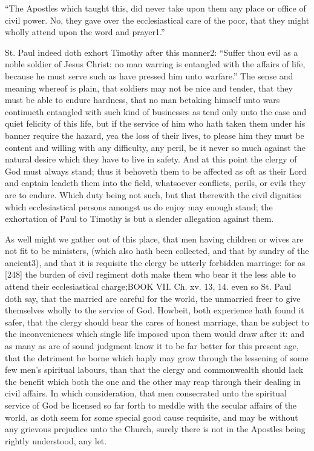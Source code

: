 “The Apostles which taught this, did never take upon them any place or office of civil power. No, they gave over the ecclesiastical care of the poor, that they might wholly attend upon the word and prayer1.”

St. Paul indeed doth exhort Timothy after this manner2: “Suffer thou evil as a noble soldier of Jesus Christ: no man warring is entangled with the affairs of life, because he must serve such as have pressed him unto warfare.” The sense and meaning whereof is plain, that soldiers may not be nice and tender, that they must be able to endure hardness, that no man betaking himself unto wars continueth entangled with such kind of businesses as tend only unto the ease and quiet felicity of this life, but if the service of him who hath taken them under his banner require the hazard, yea the loss of their lives, to please him they must be content and willing with any difficulty, any peril, be it never so much against the natural desire which they have to live in safety. And at this point the clergy of God must always stand; thus it behoveth them to be affected as oft as their Lord and captain leadeth them into the field, whatsoever conflicts, perils, or evils they are to endure. Which duty being not such, but that therewith the civil dignities which ecclesiastical persons amongst us do enjoy may enough stand; the exhortation of Paul to Timothy is but a slender allegation against them.

As well might we gather out of this place, that men having children or wives are not fit to be ministers, (which also hath been collected, and that by sundry of the ancient3), and that it is requisite the clergy be utterly forbidden marriage: for as [248] the burden of civil regiment doth make them who bear it the less able to attend their ecclesiastical charge;BOOK VII. Ch. xv. 13, 14. even so St. Paul doth say, that the married are careful for the world, the unmarried freer to give themselves wholly to the service of God. Howbeit, both experience hath found it safer, that the clergy should bear the cares of honest marriage, than be subject to the inconveniences which single life imposed upon them would draw after it: and as many as are of sound judgment know it to be far better for this present age, that the detriment be borne which haply may grow through the lessening of some few men’s spiritual labours, than that the clergy and commonwealth should lack the benefit which both the one and the other may reap through their dealing in civil affairs. In which consideration, that men consecrated unto the spiritual service of God be licensed so far forth to meddle with the secular affairs of the world, as doth seem for some special good cause requisite, and may be without any grievous prejudice unto the Church, surely there is not in the Apostles being rightly understood, any let.

